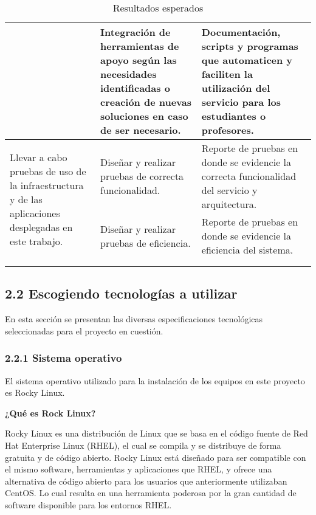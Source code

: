 \begin{spacing}{1.5}
\begin{longtable}{m{4.8cm}m{4.8cm}m{4.8cm}}
    \\ \cline{2-3}
                                                                         &
    Integración de herramientas de apoyo según las necesidades identificadas o creación de nuevas soluciones en caso de ser necesario.            &
    Documentación, scripts y programas que automaticen y faciliten la utilización del servicio para los estudiantes o profesores.                                                               \\
    \hline
    \multirow{2}{4.3cm}{Llevar a cabo pruebas de uso de la infraestructura y de las aplicaciones desplegadas en este trabajo.}            &
    Diseñar y realizar pruebas de correcta funcionalidad.                                                         &
    Reporte de pruebas en donde se evidencie la correcta funcionalidad del servicio y arquitectura.
    \\ \cline{2-3}
                                                                         &
    Diseñar y realizar pruebas de eficiencia.            &
    Reporte de pruebas en donde se evidencie la eficiencia del sistema.                                                          \\
    \hline
    \\ 
    \caption{Resultados esperados}
    \label{table:table3}
    \end{longtable}

    \subsection{2.2 Escogiendo tecnologías a utilizar}
    En esta sección se presentan las diversas especificaciones tecnológicas seleccionadas para el proyecto en cuestión.

    \subsubsection{2.2.1 Sistema operativo}
    El sistema operativo utilizado para la instalación de los equipos en este proyecto es Rocky Linux.

    \textbf{¿Qué es Rock Linux?}
    
    Rocky Linux es una distribución de Linux que se basa en el código fuente de Red Hat Enterprise Linux (RHEL), el cual se compila y se distribuye de forma gratuita y de código abierto. Rocky Linux está diseñado para ser compatible con el mismo software, herramientas y aplicaciones que RHEL, y ofrece una alternativa de código abierto para los usuarios que anteriormente utilizaban CentOS. Lo cual resulta en una herramienta poderosa por la gran cantidad de software disponible para los entornos RHEL.


\end{spacing}
